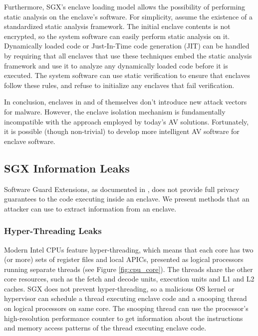 Furthermore, SGX's enclave loading model allows the possibility of performing
static analysis on the enclave's software. For simplicity, assume the existence
of a standardized static analysis framework.  The initial enclave contents is
not encrypted, so the system software can easily perform static analysis on it.
Dynamically loaded code or Just-In-Time code generation (JIT) can be handled by
requiring that all enclaves that use these techniques embed the static analysis
framework and use it to analyze any dynamically loaded code before it is
executed. The system software can use static verification to ensure that
enclaves follow these rules, and refuse to initialize any enclaves that fail
verification.

In conclusion, enclaves in and of themselves don't introduce new attack vectors
for malware. However, the enclave isolation mechanism is fundamentally
incompatible with the approach employed by today's AV solutions. Fortunately,
it is possible (though non-trivial) to develop more intelligent AV software for
enclave software.


\subsection{SGX Information Leaks}
\label{sec:sgx_leaks}

Software Guard Extensions, as documented in \cite{intel2015sdm}, does not
provide full privacy guarantees to the code executing inside an enclave. We
present methods that an attacker can use to extract information from an
enclave.

\subsubsection{Hyper-Threading Leaks}

Modern Intel CPUs feature hyper-threading, which means that each core has two
(or more) sets of register files and local APICs, presented as logical
processors running separate threads (see Figure \ref{fig:cpu_core}). The
threads share the other core resources, such as the fetch and decode units,
execution units and L1 and L2 caches. SGX does not prevent hyper-threading, so
a malicious OS kernel or hypervisor can schedule a thread executing enclave
code and a snooping thread on logical processors on same core. The snooping
thread can use the processor's high-resolution performance counter
\cite{petters1999making} to get information about the instructions and memory
access patterns of the thread executing enclave code.

